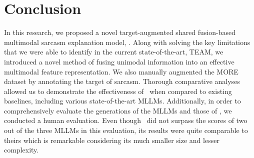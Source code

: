 \section{Conclusion} \label{sec:con}
In this research, we proposed a novel target-augmented shared fusion-based multimodal sarcasm explanation model, \model. Along with solving the key limitations that we were able to identify in the current state-of-the-art, TEAM, we introduced a novel method of fusing unimodal information into an effective multimodal feature representation. We also manually augmented the MORE dataset by annotating the target of sarcasm. Thorough comparative analyses allowed us to demonstrate the effectiveness of \model\ when compared to existing baselines, including various state-of-the-art MLLMs. Additionally, in order to comprehensively evaluate the generations of the MLLMs and those of \model, we conducted a human evaluation. Even though \model\ did not surpass the scores of two out of the three MLLMs in this evaluation, its results were quite comparable to theirs which is remarkable considering its much smaller size and lesser complexity.  
